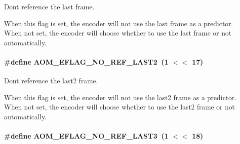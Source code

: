 Don\textquotesingle{}t reference the last frame. 

When this flag is set, the encoder will not use the last frame as a predictor. When not set, the encoder will choose whether to use the last frame or not automatically. 
\paragraph[{\texorpdfstring{A\+O\+M\+\_\+\+E\+F\+L\+A\+G\+\_\+\+N\+O\+\_\+\+R\+E\+F\+\_\+\+L\+A\+S\+T2}{AOM_EFLAG_NO_REF_LAST2}}]{\setlength{\rightskip}{0pt plus 5cm}\#define A\+O\+M\+\_\+\+E\+F\+L\+A\+G\+\_\+\+N\+O\+\_\+\+R\+E\+F\+\_\+\+L\+A\+S\+T2~(1 $<$$<$ 17)}\hypertarget{group__aom__encoder_ga50c2560ca6670298cfc614ecae96a391}{}\label{group__aom__encoder_ga50c2560ca6670298cfc614ecae96a391}


Don\textquotesingle{}t reference the last2 frame. 

When this flag is set, the encoder will not use the last2 frame as a predictor. When not set, the encoder will choose whether to use the last2 frame or not automatically. 
\paragraph[{\texorpdfstring{A\+O\+M\+\_\+\+E\+F\+L\+A\+G\+\_\+\+N\+O\+\_\+\+R\+E\+F\+\_\+\+L\+A\+S\+T3}{AOM_EFLAG_NO_REF_LAST3}}]{\setlength{\rightskip}{0pt plus 5cm}\#define A\+O\+M\+\_\+\+E\+F\+L\+A\+G\+\_\+\+N\+O\+\_\+\+R\+E\+F\+\_\+\+L\+A\+S\+T3~(1 $<$$<$ 18)}\hypertarget{group__aom__encoder_gaa4bc8ae2b977b73f0ef57ba428ca1d2c}{}\label{group__aom__encoder_gaa4bc8ae2b977b73f0ef57ba428ca1d2c}


